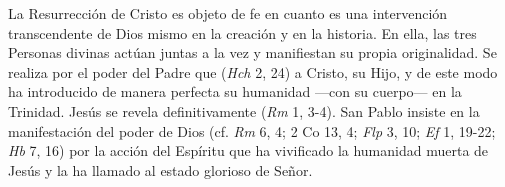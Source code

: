 	
	 La Resurrección de Cristo es objeto de fe en cuanto es una intervención transcendente de Dios mismo en la creación y en la historia. En ella, las tres Personas divinas actúan juntas a la vez y manifiestan su propia originalidad. Se realiza por el poder del Padre que  (\emph{Hch} 2, 24) a Cristo, su Hijo, y de este modo ha introducido de manera perfecta su humanidad ---con su cuerpo--- en la Trinidad. Jesús se revela definitivamente  (\emph{Rm} 1, 3-4). San Pablo insiste en la manifestación del poder de Dios (cf. \emph{Rm} 6, 4; 2 Co 13, 4; \emph{Flp} 3, 10; \emph{Ef} 1, 19-22; \emph{Hb} 7, 16) por la acción del Espíritu que ha vivificado la humanidad muerta de Jesús y la ha llamado al estado glorioso de Señor.
